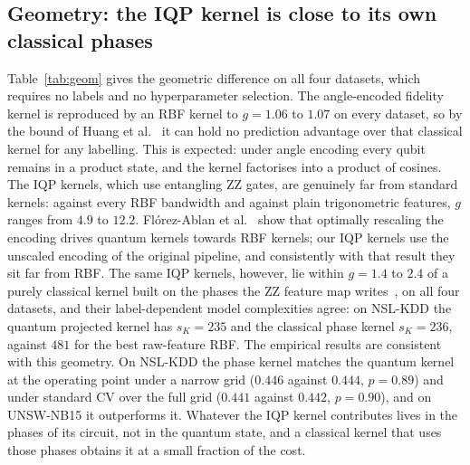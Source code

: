 \documentclass[preprint,11pt]{elsarticle}
\begin{document}
\subsection{Geometry: the IQP kernel is close to its own classical phases}\label{sec:kgeom}
Table~\ref{tab:geom} gives the geometric difference on all four datasets, which requires no labels and no
hyperparameter selection. The angle-encoded fidelity kernel is reproduced by an RBF kernel to $g=1.06$ to
$1.07$ on every dataset, so by the bound of Huang et al.~\cite{huang2021power} it can hold no prediction
advantage over that classical kernel for any labelling. This is expected: under angle encoding every qubit
remains in a product state, and the kernel factorises into a product of cosines. The IQP kernels, which
use entangling ZZ gates, are genuinely far from standard kernels: against every RBF bandwidth and against
plain trigonometric features, $g$ ranges from $4.9$ to $12.2$. Fl\'orez-Ablan et al.~\cite{florezablan2025similarity}
show that optimally rescaling the encoding drives quantum kernels towards RBF kernels; our IQP kernels use
the unscaled encoding of the original pipeline, and consistently with that result they sit far from RBF. The same IQP kernels, however, lie within
$g=1.4$ to $2.4$ of a purely classical kernel built on the phases the ZZ feature map
writes~\cite{havlicek2019supervised}, on all four datasets, and their label-dependent model complexities
agree: on NSL-KDD the quantum projected kernel has $s_K=235$ and the classical phase kernel $s_K=236$, against
$481$ for the best raw-feature RBF. The empirical results are consistent with this geometry. On NSL-KDD the
phase kernel matches the quantum kernel at the operating point under a narrow grid ($0.446$ against
$0.444$, $p=0.89$) and under standard CV over the full grid ($0.441$ against $0.442$, $p=0.90$), and on
UNSW-NB15 it outperforms it. Whatever the IQP kernel contributes lives in the phases of its circuit, not
in the quantum state, and a classical kernel that uses those phases obtains it at a small fraction of the
cost.
\end{document}
